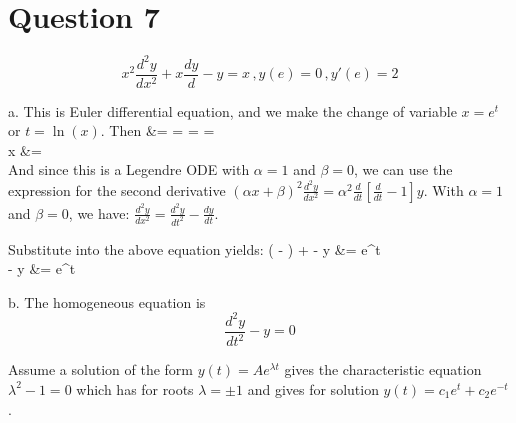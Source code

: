 \documentclass[12pt,twoside]{article}
\begin{document}
\section*{Question 7}
\[
	x^2 \frac{d^2 y}{dx^2} + x \frac{dy}{d} - y = x \, , y(e) = 0 \, , y'(e) = 2
\]

\be 
\item [a.]
This is Euler differential equation, and we make the change of variable $x=e^t$ or $t=\ln(x)$.
Then
\ba
	 &=   =   =    =     \\ 
	x   &=  \\
\ea
And since this is a Legendre ODE with $\alpha=1$ and $\beta=0$, we can use the expression for the second derivative 
$(\alpha x + \beta)^2 \frac{d^2y}{dx^2} = \alpha^2 \frac{d}{d t} [\frac{d}{dt} - 1] y$.
With $\alpha=1$ and $\beta=0$, we have: $ \frac{d^2y}{dx^2} =  \frac{d^2y}{dt^2} - \frac{dy}{dt}$. \\ \hfill \break

Substitute into the above equation yields:
\ba
	(  - ) +  - y &= e^t \\
	  - y &= e^t \\
\ea

\item [b.]
The homogeneous equation is
\[
	 \frac{d^2y}{dt^2} - y = 0
\]

Assume a solution of the form $y(t) = A e^{\lambda t}$ gives the characteristic equation $\lambda^2 - 1 = 0$ which has for roots $\lambda = \pm1$ and gives
for solution $y(t) = c_1 e^t + c_2 e^{-t}$.
\end{document}
